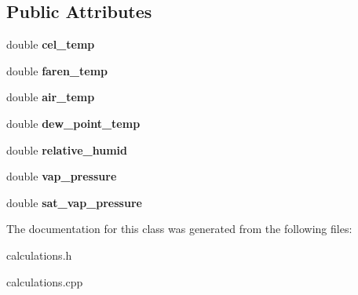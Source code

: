 \subsection*{Public Attributes}
\begin{DoxyCompactItemize}
\item 
\mbox{\label{classcalculations_ab91a4811df6f354527e51b177f0f2695}} 
double {\bfseries cel\+\_\+temp}
\item 
\mbox{\label{classcalculations_aff43769ef6563aa40705c3cabc757726}} 
double {\bfseries faren\+\_\+temp}
\item 
\mbox{\label{classcalculations_ab8c2bf801e553f6b6becfa7ead6fc637}} 
double {\bfseries air\+\_\+temp}
\item 
\mbox{\label{classcalculations_ae71819d3ad2561442299690d75998e42}} 
double {\bfseries dew\+\_\+point\+\_\+temp}
\item 
\mbox{\label{classcalculations_a144adda843a20573360cfbdbef58423a}} 
double {\bfseries relative\+\_\+humid}
\item 
\mbox{\label{classcalculations_accf3419d1ccf8dede14c732c991f775e}} 
double {\bfseries vap\+\_\+pressure}
\item 
\mbox{\label{classcalculations_a60df1762a9eea5a8e5d81aea36a8e93d}} 
double {\bfseries sat\+\_\+vap\+\_\+pressure}
\end{DoxyCompactItemize}


The documentation for this class was generated from the following files\+:\begin{DoxyCompactItemize}
\item 
calculations.\+h\item 
calculations.\+cpp\end{DoxyCompactItemize}
